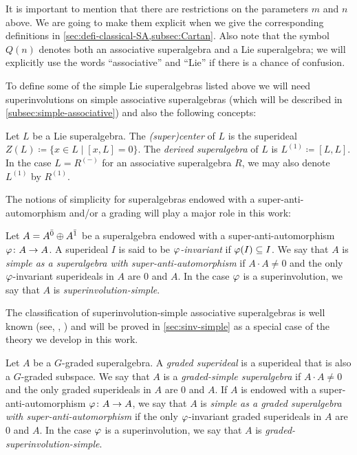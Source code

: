 It is important to mention that there are restrictions on the parameters $m$ and $n$ above. 
We are going to make them explicit when we give the corresponding definitions in \cref{sec:defi-classical-SA,subsec:Cartan}. 
Also note that the symbol $Q(n)$ denotes both an associative superalgebra and a Lie superalgebra; we will explicitly use the words ``associative'' and ``Lie'' if there is a chance of confusion. 

To define some of the simple Lie superalgebras listed above we will need superinvolutions on simple associative superalgebras (which will be described in \cref{subsec:simple-associative}) and also the following concepts:

\begin{defi}
    Let $L$ be a Lie superalgebra. 
    The \emph{(super)center} of $L$ is the superideal $Z(L) \coloneqq \{ x\in L \mid [x, L] = 0\}$. 
    The \emph{derived superalgebra} of $L$ is $L^{(1)} \coloneqq [L, L]$. 
    In the case $L = R^{(-)}$ for an associative superalgebra $R$, we may also denote $L^{(1)}$ by $R^{(1)}$. 
\end{defi}

The notions of simplicity for superalgebras endowed with a super-anti-automorphism and/or a grading will play a major role in this work:

\begin{defi}\label{defi:superinvolution-simple}
    Let $A = A^{\bar0} \oplus A^{\bar1}$ be a superalgebra endowed with a super-anti-automorphism $\varphi\colon A \to A$. 
    A superideal $I$ is said to be \emph{$\varphi$-invariant} if $\varphi(I) \subseteq I$. 
    We say that $A$ is \emph{simple as a superalgebra with super-anti-automorphism} if $A\cdot A \neq 0$ and the only $\varphi$-invariant superideals in $A$ are $0$ and $A$. 
    In the case $\varphi$ is a superinvolution, we say that $A$ is \emph{superinvolution-simple}.
\end{defi}

The classification of superinvolution-simple associative superalgebras is well known (see, \eg, \cite{racine}) and will be proved in \cref{sec:sinv-simple} as a special case of the theory we develop in this work. 

\begin{defi}\label{defi:graded-simple}
    Let $A$ be a $G$-graded superalgebra. 
    A \emph{graded superideal} is a superideal that is also a $G$-graded subspace. 
    We say that $A$ is a  \emph{graded-simple superalgebra} if $A\cdot A \neq 0$ and the only graded superideals in $A$ are $0$ and $A$. 
    If $A$ is endowed with a super-anti-automorphism $\varphi\colon A \to A$, we say that $A$ is \emph{simple as a graded superalgebra with super-anti-automorphism} if the only $\varphi$-invariant graded superideals in $A$ are $0$ and $A$. 
    In the case $\varphi$ is a superinvolution, we say that $A$ is \emph{graded-superinvolution-simple}.
\end{defi}

